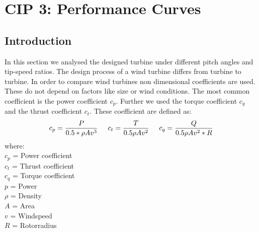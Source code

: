 \documentclass[10pt]{article}
\begin{document}
\newpage
\section{CIP 3: Performance Curves}
\subsection{Introduction}
In this section we analysed the designed turbine under different pitch angles and tip-speed ratios. The design process of a wind turbine differs from turbine to turbine. In order to compare wind turbines non dimensional coefficients are used. These do not depend on factors like size or wind conditions. The most common coefficient is the power coefficient $c_p$. Further we used the torque coefficient $c_q$ and the thrust coefficient $c_t$.
These coefficient are defined as:
\begin{align*}
c_p = \frac{P}{0.5 *\rho A v^3}\hspace{0.5cm}c_t =  \frac{T}{0.5\rho A v^2}\hspace{0.5cm}c_q = \frac{Q}{0.5\rho A v^2*R}\\
\end{align*}
where:\\
$c_p$ = Power coefficient\\
$c_t$ = Thrust coefficient\\
$c_q$ = Torque coefficient\\
$p$   = Power\\
$\rho$ = Density\\
$A$    = Area\\
$v$	   = Windspeed\\
$R$		= Rotorradius
\end{document}
